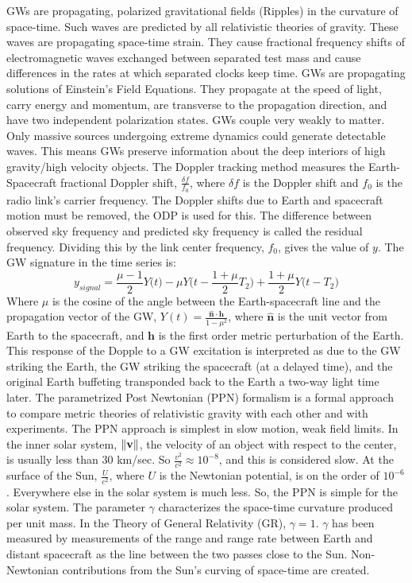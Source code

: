 \documentclass[oneside]{book}
\theoremstyle{mystyle}
\DeclarePairedDelimiter\norm{\lVert}{\rVert}
\begin{document}
\noindent GWs are propagating, polarized gravitational fields (Ripples) in the curvature of space-time. Such waves are predicted by all relativistic theories of gravity. These waves are propagating space-time strain. They cause fractional frequency shifts of electromagnetic waves exchanged between separated test mass and cause differences in the rates at which separated clocks keep time. GWs are propagating solutions of Einstein's Field Equations. They propagate at the speed of light, carry energy and momentum, are transverse to the propagation direction, and have two independent polarization states. GWs couple very weakly to matter. Only massive sources undergoing extreme dynamics could generate detectable waves. This means GWs preserve information about the deep interiors of high gravity/high velocity objects. The Doppler tracking method measures the Earth-Spacecraft fractional Doppler shift, $\frac{\delta f}{f_0}$, where $\delta f$ is the Doppler shift and $f_0$ is the radio link's carrier frequency. The Doppler shifts due to Earth and spacecraft motion must be removed, the ODP is used for this. The difference between observed sky frequency and predicted sky frequency is called the residual frequency. Dividing this by the link center frequency, $f_0$, gives the value of $y$. The GW signature in the time series is:
\begin{equation}
y_{signal} = \frac{\mu-1}{2}Y\big(t\big)- \mu Y\big(t-\frac{1+\mu}{2}T_2\big)+\frac{1+\mu}{2}Y\big(t-T_2\big)
\end{equation}
Where $\mu$ is the cosine of the angle between the Earth-spacecraft line and the propagation vector of the GW, $Y(t) = \frac{\hat{\mathbf{n}}\cdot \mathbf{h}}{1-\mu^2}$, where $\hat{\mathbf{n}}$ is the unit vector from Earth to the spacecraft, and $\mathbf{h}$ is the first order metric perturbation of the Earth. This response of the Dopple to a GW excitation is interpreted as due to the GW striking the Earth, the GW striking the spacecraft (at a delayed time), and the original Earth buffeting transponded back to the Earth a two-way light time later. The parametrized Post Newtonian (PPN) formalism is a formal approach to compare metric theories of relativistic gravity with each other and with experiments. The PPN approach is simplest in slow motion, weak field limits. In the inner solar system, $\norm{\mathbf{v}}$, the velocity of an object with respect to the center, is usually less than 30 km/sec. So $\frac{v^2}{c^2} \approx 10^{-8}$, and this is considered slow. At the surface of the Sun, $\frac{U}{c^2}$, where $U$ is the Newtonian potential, is on the order of $10^{-6}$. Everywhere else in the solar system is much less. So, the PPN is simple for the solar system. The parameter $\gamma$ characterizes the space-time curvature produced per unit mass. In the Theory of General Relativity (GR), $\gamma=1$. $\gamma$ has been measured by measurements of the range and range rate between Earth and distant spacecraft as the line between the two passes close to the Sun. Non-Newtonian contributions from the Sun's curving of space-time are created. 
\end{document}
